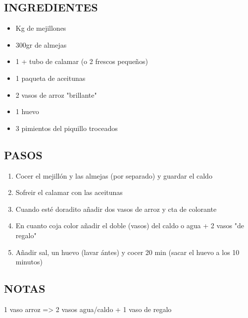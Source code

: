 
\subsection*{INGREDIENTES}
\begin{itemize}
    \item {} Kg de mejillones
    \item 300gr de almejas
    \item 1 +  tubo de calamar (o 2 frescos pequeños)
    \item 1 paqueta de aceitunas
    \item 2 vasos de arroz "brillante"
    \item 1 huevo
    \item 3 pimientos del piquillo troceados

\end{itemize}

\subsection*{PASOS}
\begin{enumerate}
    \item Cocer el mejillón y las almejas (por separado) y guardar el caldo
    \item Sofreir el calamar con las aceitunas
    \item Cuando esté doradito añadir dos vasos de arroz y  cta de colorante
    \item En cuanto coja color añadir el doble (vasos) del caldo o agua + 2 vasos "de regalo"
    \item Añadir sal, un huevo (lavar ántes) y cocer 20 min (sacar el huevo a los 10 minutos)
\end{enumerate}

\subsection*{NOTAS}
1 vaso arroz => 2 vasos agua/caldo + 1 vaso de regalo
